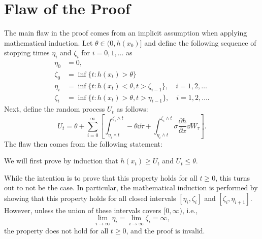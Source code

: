 \documentclass[twocolumn,amsthm]{autart}
\begin{document}
\section{Flaw of the Proof}
The main flaw in the proof comes from an implicit assumption when applying mathematical induction. Let $\theta \in (0, h(x_0)]$ and define the following sequence of stopping times $\eta_i$ and $\zeta_i$ for $i = 0, 1, \dots$ as
\begin{align}
    \eta_0 &= 0, \\
    \zeta_0 &= \inf\{ t : h(x_t) > \theta \} \\
    \eta_i &= \inf\{ t : h(x_t) < \theta, t > \zeta_{i-1} \}, \quad i = 1, 2, \dots \\
    \zeta_i &= \inf\{ t : h(x_t) > \theta, t > \eta_{i-1} \}, \quad i = 1, 2, \dots.
\end{align}
Next, define the random process $U_t$ as follows:
\begin{equation}
    U_t = \theta + \sum_{i=0}^\infty \left[ \int_{\eta_i \wedge t}^{\zeta_i \wedge t} -\theta \dd{\tau} + \int_{\eta_i \wedge t}^{\zeta_i \wedge t} \sigma \frac{\partial h}{\partial x} \dd{W}_\tau \right].
\end{equation} 
The flaw then comes from the following statement:
\begin{displayquote}
We will first prove by induction that $h(x_t) \geq U_t$ and $U_t \leq \theta$.
\end{displayquote}
While the intention is to prove that this property holds for all $t \geq 0$, this turns out to not be the case. In particular, the mathematical induction is performed by showing that this property holds for all closed intervals $[\eta_i, \zeta_i]$ and $[\zeta_i, \eta_{i+1}]$. However, unless the union of these intervals covers $[0, \infty)$, i.e.,
\begin{equation}
  \lim_{i \to \infty} \eta_i = \lim_{i \to \infty} \zeta_i = \infty,
\end{equation}
the property does not hold for all $t \geq 0$, and the proof is invalid.
\end{document}
